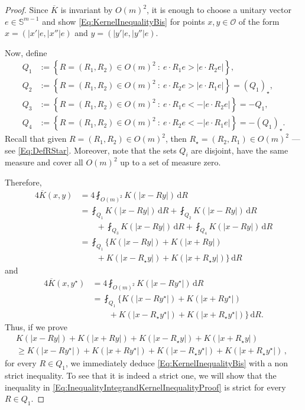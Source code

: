 \documentclass[12pt,reqno]{amsart}
\theoremstyle{definition}
\theoremstyle{remark}
\newcommand{\con}[1]{\mathbb{#1}}
\newcommand{\Sph}{\con{S}} %
\newcommand{\ocal}{\mathcal{O}}
\renewcommand{\d}{\,\mathrm{d}} %
\newcommand{\setcond}[2]{\left \{ #1 \ : \ #2  \right \}}
\newcommand{\average}{\fint}
\numberwithin{equation}{section}
\begin{document}
\begin{proof}
	Since $\overline{K}$ is invariant by $O(m)^2$, it is enough to choose a unitary vector $e \in \Sph^{m-1}$ and show \eqref{Eq:KernelInequalityBis} for points $x, y\in \ocal$ of the form $x = (|x'|e, |x''|e)$ and $y = (|y'|e, |y''|e)$.
	
	Now, define
	\begin{equation}
	\label{Eq:DefQ}
	\begin{split}
	Q_1 &:= \setcond{R = (R_1,R_2) \in O(m)^2}{e\cdot R_1 e > |e\cdot R_2 e|},\\
	Q_2 &:= \setcond{R = (R_1,R_2) \in O(m)^2}{e\cdot R_2 e > |e\cdot R_1 e|} = (Q_1)_\star,\\
	Q_3 &:= \setcond{R = (R_1,R_2) \in O(m)^2}{e\cdot R_1 e < -|e\cdot R_2 e|} = -Q_1,\\
	Q_4 &:= \setcond{R = (R_1,R_2) \in O(m)^2}{e\cdot R_2 e < - |e\cdot R_1 e|} = -(Q_1)_\star.
	\end{split}
	\end{equation}
	Recall that given $R=(R_1,R_2)\in O(m)^2$, then $R_\star=(R_2,R_1)\in O(m)^2$ ---see \eqref{Eq:DefRStar}. Moreover, note that the sets $Q_i$ are disjoint, have the same measure and cover all $O(m)^2$ up to a set of measure zero. 
	
	Therefore,
	\begin{align*}
	4\overline{K} (x, y) &= 4\average_{O(m)^2} K(|x - R y|)\d R \\
	& = \average_{Q_1} K(|x - R y|)\d R + \average_{Q_2} K(|x - R y|)\d R \\
	& \quad \quad
	+ \average_{Q_3} K(|x - R y|)\d R +
	\average_{Q_4} K(|x - R y|)\d R \\
	&= \average_{Q_1} \{K(|x - R y|) + K(|x + R y|) \\
	&\quad \quad + K(|x - R_\star y|) + K(|x + R_\star y|)\}\d R
	\end{align*}
	and
	\begin{align*}
	4\overline{K} (x, y^\star) &= 4\average_{O(m)^2} K(|x - R y^\star|)\d R \\
	& = \average_{Q_1} \{K(|x - R y^\star|) + K(|x + R y^\star|) \\
	&\quad \quad + K(|x - R_\star y^\star|) + K(|x + R_\star y^\star|)\}\d R.
	\end{align*}
	Thus, if we prove
	\begin{equation}
	\label{Eq:InequalityIntegrandKernelInequalityProof}
	\begin{split}
	K(|x - R y|) + K(|x + R y|) + K(|x - R_\star y|) + K(|x + R_\star y|)
	\quad \quad \quad \quad 
	\\
	\geq
	K(|x - R y^\star|) + K(|x + R y^\star|)+K(|x - R_\star y^\star|) + K(|x + R_\star y^\star|)\,,
	\end{split}
	\end{equation}
	for every $R\in Q_1$, we immediately deduce \eqref{Eq:KernelInequalityBis} with a non strict inequality. To see that it is indeed a strict one, we will show that the inequality in \eqref{Eq:InequalityIntegrandKernelInequalityProof} is strict for every $R \in Q_1$.
	

\end{proof}
\end{document}
